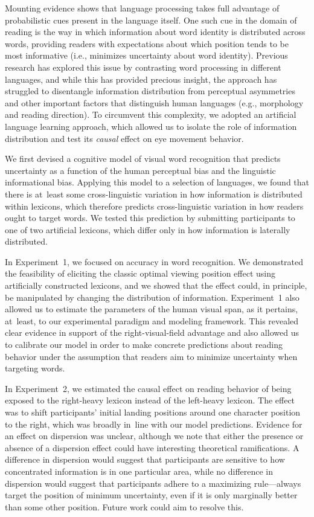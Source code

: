 \documentclass[doc,biblatex,floatsintext]{apa7}
\begin{document}
Mounting evidence shows that language processing takes full advantage of probabilistic cues present in the language itself. One such cue in the domain of reading is the way in which information about word identity is distributed across words, providing readers with expectations about which position tends to be most informative (i.e., minimizes uncertainty about word identity). Previous research has explored this issue by contrasting word processing in different languages, and while this has provided precious insight, the approach has struggled to disentangle information distribution from perceptual asymmetries and other important factors that distinguish human languages (e.g., morphology and reading direction). To circumvent this complexity, we adopted an artificial language learning approach, which allowed us to isolate the role of information distribution and test its \textit{causal} effect on eye movement behavior.

We first devised a cognitive model of visual word recognition that predicts uncertainty as a function of the human perceptual bias and the linguistic informational bias. Applying this model to a selection of languages, we found that there is at~least some cross-linguistic variation in how information is distributed within lexicons, which therefore predicts cross-linguistic variation in how readers ought to target words. We tested this prediction by submitting participants to one of two artificial lexicons, which differ only in how information is laterally distributed.

In Experiment~1, we focused on accuracy in word recognition. We demonstrated the feasibility of eliciting the classic optimal viewing position effect \parencite{ORegan:1984, Brysbaert:2005, Hyona:2011} using artificially constructed lexicons, and we showed that the effect could, in principle, be manipulated by changing the distribution of information. Experiment~1 also allowed us to estimate the parameters of the human visual span, as it pertains, at~least, to our experimental paradigm and modeling framework. This revealed clear evidence in support of the right-visual-field advantage and also allowed us to calibrate our model in order to make concrete predictions about reading behavior under the assumption that readers aim to minimize uncertainty when targeting words.

In Experiment~2, we estimated the causal effect on reading behavior of being exposed to the right-heavy lexicon instead of the left-heavy lexicon. The effect was to shift participants' initial landing positions around one character position to the right, which was broadly in~line with our model predictions. Evidence for an effect on dispersion was unclear, although we note that either the presence or absence of a dispersion effect could have interesting theoretical ramifications. A difference in dispersion would suggest that participants are sensitive to how concentrated information is in one particular area, while no difference in dispersion would suggest that participants adhere to a maximizing rule---always target the position of minimum uncertainty, even if it is only marginally better than some other position. Future work could aim to resolve this.
\end{document}

